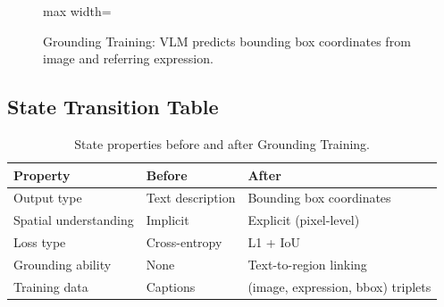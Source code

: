 \begin{figure}[h]
\centering
\begin{adjustbox}{max width=\linewidth}
\end{adjustbox}
\caption{Grounding Training: VLM predicts bounding box coordinates from image and referring expression.}
\end{figure}

\subsection{State Transition Table}
\begin{table}[h]\centering
\begin{tabular}{lll}\toprule
\textbf{Property} & \textbf{Before} & \textbf{After}\\\midrule
Output type & Text description & Bounding box coordinates\\
Spatial understanding & Implicit & Explicit (pixel-level)\\
Loss type & Cross-entropy & L1 + IoU\\
Grounding ability & None & Text-to-region linking\\
Training data & Captions & (image, expression, bbox) triplets\\\bottomrule
\end{tabular}
\caption{State properties before and after Grounding Training.}
\end{table}

\newpage
